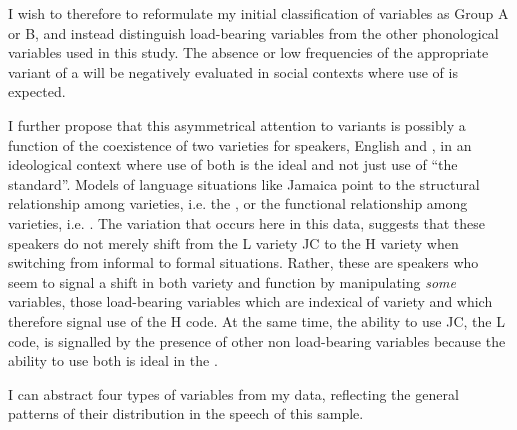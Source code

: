 I wish to therefore to reformulate my initial classification of variables as Group A or B, and instead distinguish load-bearing variables from the other phonological variables used in this study.  The absence or low frequencies of the appropriate variant of a  will be negatively evaluated in social contexts where use of  is expected.  

I further propose that this asymmetrical attention to variants is possibly a function of the coexistence of two varieties for speakers, English and , in an ideological context where use of both is the ideal and not just use of “the standard”.  Models of language situations like Jamaica point to the structural relationship among varieties, i.e. the , or the functional relationship among varieties, i.e. .  The variation that occurs here in this  data, suggests that these speakers do not merely shift from the L variety JC to the H variety  when switching from informal to formal situations.  Rather, these are speakers who seem to signal a shift in both variety and function by manipulating \textit{some} variables, those load-bearing variables which are indexical of variety and which therefore signal use of the H code.  At the same time, the ability to use JC, the L code, is signalled by the presence of other non load-bearing variables because the ability to use both is ideal in the .

I can abstract four types of variables from my data, reflecting the general patterns of their distribution in the speech of this  sample.

